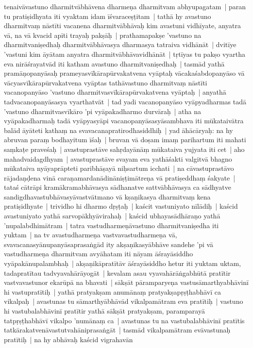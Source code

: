 \documentclass[article,a4paper]{memoir}
\begin{document}
tenaivā\-vastuno dharmitvā\-bhā\-vena dharmeṇa dharmitvam abhyupagatam | paran tu pratiṣidhyata iti vyaktam idam ī\-śvaraceṣṭitam | tathā\- hy avastuno dharmitvaṃ nā\-stī\-ti vacanena dharmitvā\-bhā\-vaḥ kim avastuni vidhī\-yate, anyatra vā\-, na vā\- kvacid apī\-ti trayaḥ pakṣā\-ḥ | \label{thakur75-88.13} prathamapakṣe 'vastuno na dharmitvaniṣedhaḥ dharmitvā\-bhā\-vasya dharmasya tatraiva vidhā\-nā\-t | \label{thakur75-88.14} dvitī\-ye 'vastuni kim ā\-yā\-tam anyatra dharmitvā\-bhā\-vavidhā\-nā\-t | \label{thakur75-88.15} tṛtī\-yas tu pakṣo vyartha eva nirā\-śrayatvā\-d iti katham avastuno dharmitvaniṣedhaḥ | tasmā\-d yathā\- pramā\-ṇopanyā\-saḥ prameyasvī\-kā\-rapū\-rvakatvena vyā\-ptaḥ vā\-cakaśabdopanyā\-so vā\- vā\-cyasvī\-kā\-rapū\-rvakatvena vyā\-ptas tathā\-vastuno dharmitvaṃ nā\-stī\-ti vacanopanyā\-so 'vastuno dharmitvasvī\-kā\-rapū\-rvakatvena vyā\-ptaḥ | anyathā\- tadvacanopanyā\-sasya vyarthatvā\-t | \label{thakur75-88.19} tad yadi vacanopanyā\-so vyā\-pyadharmas tadā\- 'vastuno dharmitvasvī\-kā\-ro 'pi vyā\-pakadharmo durvā\-raḥ | atha na vyā\-pakadharmaḥ tadā\- vyā\-pyasyā\-pi vacanopanyā\-sasyā\-sambhava iti mū\-kataivā\-tra balā\-d ā\-yā\-teti kathaṃ na svavacanapratirodhasiddhiḥ | \label{thakur75-88.22} yad ā\-hā\-cā\-ryaḥ: na hy abruvan paraṃ bodhayitum ī\-śaḥ | bruvan vā\- doṣam imaṃ parihartum iti mahati saṃkaṭe praveśaḥ | \label{thakur75-88.24} avastuprastā\-ve sahṛdayā\-nā\-ṃ mū\-kataiva yujyata iti cet | aho mahadvaidagdhyam | avastuprastā\-ve svayam eva yathā\-śakti valgitvā\- bhagno mū\-kataiva nyā\-yaprā\-pteti paribhā\-ṣayā\- niḥsartum icchati | na cā\-vastuprastā\-vo rā\-jadaṇḍena vinā\- caraṇamardanā\-dinā\-niṣṭimā\-treṇa vā\- pratiṣeddhaṃ śakyate | tataś cā\-trā\-pi kramā\-kramabhā\-vasya sā\-dhanatve sattvā\-bhā\-vasya ca sā\-dhyatve sandigdhavastubhā\-vasyā\-vastvā\-tmano vā\- kṣaṇikasya dharmitvaṃ kena pratiṣidhyate | \label{thakur75-89.1} trividho hi dharmo dṛṣṭaḥ | kaścit vastuniyato nī\-lā\-diḥ | kaścid avastuniyato yathā\- sarvopā\-khyā\-virahaḥ | kaścid ubhayasā\-dhā\-raṇo yathā\- 'nupalabdhimā\-tram | tatra vastudharmeṇā\-vastuno dharmitvaniṣedha iti yuktam | na tv avastudharmeṇa vastvavastudharmeṇa vā\-, svavacanasyā\-nupanyā\-saprasaṅgā\-d ity akṣaṇikasyā\-bhā\-ve sandehe 'pi vā\- vastudharmeṇa dharmitvam avyā\-hatam iti nā\-yam ā\-śrayā\-siddho vyā\-pakā\-nupalambhaḥ | \label{thakur75-89.6} akṣaṇikā\-pratī\-tā\-v ā\-śrayā\-siddho hetur iti yuktam uktam, tadapratī\-tau tadvyavahā\-rā\-yogā\-t | kevalam asau vyavahā\-rā\-ṅgabhū\-tā\- pratī\-tir vastvavastunor ekarū\-pā\- na bhavati | sā\-kṣā\-t pā\-ramparyeṇa vastusā\-marthyabhā\-vinī\- hi vastupratī\-tiḥ | yathā\- pratyakṣam anumā\-naṃ pratyakṣapṛṣṭhabhā\-vī\- ca vikalpaḥ | avastunas tu sā\-marthyā\-bhā\-vā\-d vikalpamā\-tram eva pratī\-tiḥ | vastuno hi vastubalabhā\-vinī\- pratī\-tir yathā\- sā\-kṣā\-t pratyakṣam, paramparayā\- tatpṛṣṭhabhā\-vī\- vikalpo 'numā\-naṃ ca | avastunas tu na vastubalabhā\-vinī\- pratī\-tis tatkā\-rakatvenā\-vastutvahā\-niprasaṅgā\-t | tasmā\-d vikalpamā\-tram evā\-vastunaḥ pratī\-tiḥ | \label{thakur75-89.12} na hy abhā\-vaḥ kaścid vigrahavā\-n 
\end{document}
